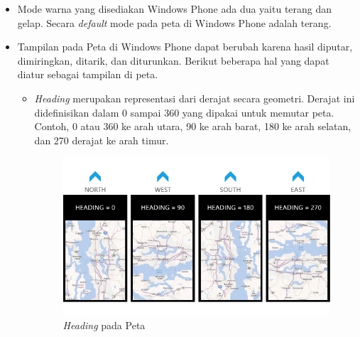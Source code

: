 \begin{itemize}
	\item	Mode warna yang disediakan Windows Phone ada dua yaitu terang dan gelap. Secara \textit{default} mode pada peta di Windows Phone adalah terang.
	
	\item Tampilan pada Peta di Windows Phone dapat berubah karena hasil diputar, dimiringkan, ditarik, dan diturunkan. Berikut beberapa hal yang dapat diatur sebagai tampilan di peta.
	
		\begin{itemize}
			\item \textit{Heading} merupakan representasi dari derajat secara geometri. Derajat ini didefinisikan dalam 0 sampai 360 yang dipakai untuk memutar peta. Contoh, 0 atau 360 ke arah utara, 90 ke arah barat, 180 ke arah selatan, dan 270 derajat ke arah timur.
			\begin{figure}[h]
				\centering
					\includegraphics[scale=0.5]{Gambar/kontrol/heading}
				\caption{\textit{Heading} pada Peta\cite{MSDN}}
				\label{fig:heading}
			\end{figure}
			

\end{itemize}
\end{itemize}
